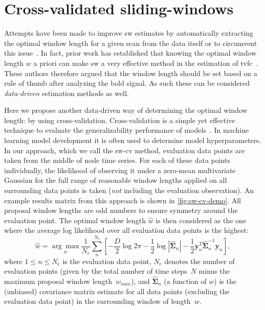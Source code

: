 \clearpage
\section{Cross-validated sliding-windows}
\label{sec:cross-validated-sw}

Attempts have been made to improve \gls{sw} estimates by automatically extracting the optimal window length for a given scan from the data itself or to circumvent this issue~\parencite[see e.g.][]{Wang2014, Xu2015, Yaesoubi2018}.
In fact, prior work has established that knowing the optimal window length $w$ a priori can make \gls{sw} a very effective method in the estimation of \gls{tvfc}~\parencite{Zalesky2015}.
These authors therefore argued that the window length should be set based on a rule of thumb after analyzing the \gls{bold} signal.
As such these can be considered \emph{data-driven} estimation methods as well.

Here we propose another data-driven way of determining the optimal window length: by using cross-validation.
Cross-validation is a simple yet effective technique to evaluate the generalizability performance of models~\parencite[see e.g.][section 8.2.4]{Deisenroth2019}.
In machine learning model development it is often used to determine model hyperparameters.
%
In our approach, which we call the \gls{sw-cv} method, evaluation data points are taken from the middle of node time series.
For each of these data points individually, the likelihood of observing it under a zero-mean multivariate Gaussian for the full range of reasonable window lengths applied on all surrounding data points is taken (\emph{not} including the evaluation observation).
An example results matrix from this approach is shown in \cref{fig:sw-cv-demo}.
%
All proposal window lengths are odd numbers to ensure symmetry around the evaluation point.
The optimal window length $\hat{w}$ is then considered as the one where the average log likelihood over all evaluation data points is the highest:
\begin{equation}
  \hat{w} = \underset{w}{\arg\max} \frac{1}{N_e} \sum_{n}^{N_e} \left[ - \frac{D}{2} \log 2\pi - \frac{1}{2} \log | \hat{\mathbf{\Sigma}}_n | - \frac{1}{2} \mathbf{y}_n^T \hat{\mathbf{\Sigma}}_n^{-1} \mathbf{y}_n \right],
\end{equation}
where $1 \leq n \leq N_e$ is the evaluation data point, $N_e$ denotes the number of evaluation points (given by the total number of time steps~$N$ minus the maximum proposal window length~$w_{max}$), and $\hat{\mathbf{\Sigma}}_n$ (a function of $w$) is the (unbiased) covariance matrix estimate for all data points (excluding the evaluation data point) in the surrounding window of length~$w$.

